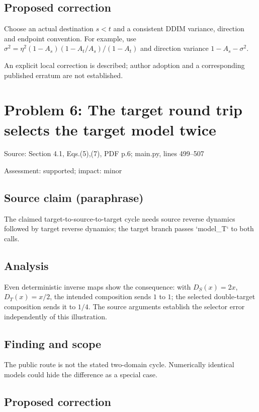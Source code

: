 \documentclass[11pt]{article}
\begin{document}
\subsection*{Proposed correction}

Choose an actual destination \(s<t\) and a consistent DDIM variance, direction and endpoint convention. For example, use \(\sigma^2=\eta^2(1-A_s)(1-A_t/A_s)/(1-A_t)\) and direction variance \(1-A_s-\sigma^2\).

An explicit local correction is described; author adoption and a corresponding published erratum are not established.

\section*{Problem 6: The target round trip selects the target model twice}

Source: Section 4.1, Eqs.(5),(7), PDF p.6; main.py, lines 499–507

Assessment: supported; impact: minor

\subsection*{Source claim (paraphrase)}

The claimed target-to-source-to-target cycle needs source reverse dynamics followed by target reverse dynamics; the target branch passes `model\_T` to both calls.

\subsection*{Analysis}

Even deterministic inverse maps show the consequence: with \(D_S(x)=2x\), \(D_T(x)=x/2\), the intended composition sends \(1\) to \(1\); the selected double-target composition sends it to \(1/4\). The source arguments establish the selector error independently of this illustration.

\subsection*{Finding and scope}

The public route is not the stated two-domain cycle. Numerically identical models could hide the difference as a special case.

\subsection*{Proposed correction}
\end{document}
